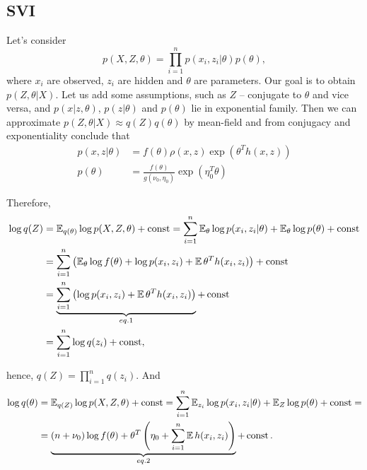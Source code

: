 \subsection{SVI}

Let's consider $$p(X, Z, \theta) = \prod_{i = 1}^n p(x_i, z_i | \theta) p(\theta),$$ where $x_i$ are observed, $z_i$ are hidden and $\theta$ are parameters. Our goal is to obtain $p(Z, \theta | X)$. Let us add some assumptions, such as $Z$ -- conjugate to $\theta$ and vice versa, and $p(x \vert z, \theta)$, $p(z \vert \theta)$ and $p(\theta)$ lie in exponential family. Then we can approximate $p(Z, \theta | X) \approx q(Z) q(\theta)$ by mean-field and from conjugacy and exponentiality conclude that
\begin{equation*}
    \begin{aligned}
        p(x, z | \theta) &= f(\theta) \rho(x, z) \exp (\theta^T h(x, z)) \\
        p(\theta) &= \frac{f(\theta)}{g(\nu_0, \eta_0)} \exp (\eta_0^T \theta)
    \end{aligned}
\end{equation*}

Therefore,
\begin{equation*}
    \begin{aligned}
        \log  q(Z) &= \operatorname{\mathbb{E}}_{q(\theta)} \log p(X, Z, \theta) + \operatorname{const} = \sum_{i = 1}^n \operatorname{\mathbb{E}}_{\theta} \log p(x_i, z_i | \theta) + \operatorname{\mathbb{E}}_\theta\log p(\theta) + \operatorname{const} \\
        &= \sum_{i = 1}^n \left( \operatorname{\mathbb{E}}_\theta \log f(\theta) + \log p(x_i, z_i) + \operatorname{\mathbb{E}} \theta^T h(x_i, z_i)\right) + \operatorname{const} \\
        &= \underbrace{\sum_{i = 1}^n \left(\log p(x_i, z_i) + \operatorname{\mathbb{E}} \theta^T h(x_i, z_i) \right)}_{eq. 1} + \operatorname{const} \\
        &= \sum_{i = 1}^n \log q(z_i) + \operatorname{const},
    \end{aligned}
\end{equation*}

hence, $q(Z) = \prod_{i = 1}^n q(z_i)$. And
\begin{equation*}
    \begin{aligned}
           \log q(\theta) &= \operatorname{\mathbb{E}}_{q(Z)} \log p(X, Z, \theta) + \operatorname{const} = \sum_{i = 1}^n \operatorname{\mathbb{E}}_{z_i} \log p(x_i, z_i | \theta) + \operatorname{\mathbb{E}}_{Z} \log p(\theta) + \operatorname{const} = \\
        &= \underbrace{(n + \nu_0) \log f(\theta) + \theta^T \left( \eta_0 + \sum_{i = 1}^n \operatorname{\mathbb{E}} h(x_i, z_i) \right)}_{eq. 2} + \operatorname{const}.
    \end{aligned}
\end{equation*}

